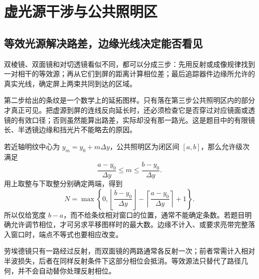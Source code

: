 \section{虚光源干涉与公共照明区}




\subsection{等效光源解决路差，边缘光线决定能否看见}
双棱镜、双面镜和对切透镜看似不同，都可以分成三步：先用反射或成像规律找到一对相干的等效源；再从它们到屏的距离计算相位差；最后追踪器件边缘所允许的真实光线，确定屏上两束共同到达的区域。

第二步给出的条纹是一个数学上的延拓图样。只有落在第三步公共照明区内的部分才真正可见。把虚源到屏的连线反向延长时，还必须检查它是否穿过对应镜面或透镜的有效口径；否则虽然能算出路差，实际却没有那一路光。这是题目中的有限镜长、半透镜边缘和挡光片不能略去的原因。

若近轴明纹中心为 $y_m=y_0+m\Delta y$，公共照明区为闭区间 $[a,b]$，那么允许级次满足
\[
 \frac{a-y_0}{\Delta y}\le m\le\frac{b-y_0}{\Delta y}.
\]
用上取整与下取整分别确定两端，得到
\begin{equation}\label{ch29:eq:depth-fringe-count}
 N=\max\!\left\{0,
 \left\lfloor\frac{b-y_0}{\Delta y}\right\rfloor
 -\left\lceil\frac{a-y_0}{\Delta y}\right\rceil+1\right\}.
\end{equation}
所以仅给宽度 $b-a$，而不给条纹相对窗口的位置，通常不能确定条数。若题目明确允许调节相位，才可另求平移图样时的最大数。边缘不计入、或要求亮带完整落入窗口时，端点不等式也要相应改变。

劳埃德镜只有一路经过反射，而双面镜的两路通常各反射一次；前者常需计入相对半波损失，后者在同样反射条件下这部分相位会抵消。等效源法只替代了路径几何，并不会自动替你处理反射相位。


